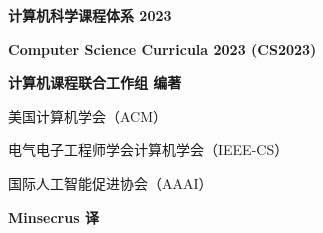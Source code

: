 \documentclass[UTF8,a4paper,zihao=5,openany,twocolumn,fontset=windows]{ctexbook}
\begin{document}
\begin{titlepage}
    \centering
    \vspace*{3cm}
    {\bfseries\songti 计算机科学课程体系 2023\par}
    \vspace{0.8cm}
    {\textbf{Computer Science Curricula 2023 (CS2023)}\par}
    \vspace{2.5cm}
    
    {\songti
    \textbf{计算机课程联合工作组 编著}\par
    \vspace{0.4cm}
    美国计算机学会（ACM）\par
    电气电子工程师学会计算机学会（IEEE-CS）\par
    国际人工智能促进协会（AAAI）\par
    }
    
    \vfill
    
    {\songti\textbf{Minsecrus 译}\par}
    \vspace*{3cm}
\end{titlepage}

\frontmatter
\fontsize{8pt}{9.6pt}\selectfont
\tableofcontents

\mainmatter
\fontsize{8pt}{9.6pt}\selectfont




















\end{document}
